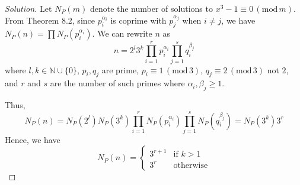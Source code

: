 \documentclass{article}
\newcommand{\N}{{\mathbb N}}
\begin{document}
\begin{proof}[Solution]
	Let $N_P(m)$ denote the number of solutions to
	$x^3 - 1 \equiv 0\, (\mathrm{mod}\,m)$.
	From Theorem 8.2, since
	$p_i^{\alpha_i}$ is coprime with $p_j^{\alpha_j}$ when $i \neq j$,
	we have $N_P(n) = \prod N_P(p_i^{\alpha_i})$.
	We can rewrite $n$ as
	\[
		n = 2^l3^k\prod_{i=1}^r p_i^{\alpha_i} \prod_{j=1}^s q_i^{\beta_j}
	\]
	where $l,k \in \N \cup \{0\}$, $p_i,q_j$ are prime,
	$p_i \equiv 1 \, (\mathrm{mod}\,3)$,
	$q_j \equiv 2 \, (\mathrm{mod}\,3)$ not $2$,
	and $r$ and $s$ are the number of such primes where $\alpha_i,\beta_j \geq 1$.

	Thus,
	\[
		N_P(n) = N_P(2^l)N_P(3^k)
		\prod_{i=1}^r N_P(p_i^{\alpha_i}) \prod_{j=1}^s N_P(q_i^{\beta_j})
		= N_P(3^k)3^r
	\]
	Hence, we have
	\[
		N_P(n) = \begin{cases}
			3^{r+1} & \text{if }k>1\\
			3^{r} & \text{otherwise}
		\end{cases}
	\]
\end{proof}
\clearpage
\end{document}
